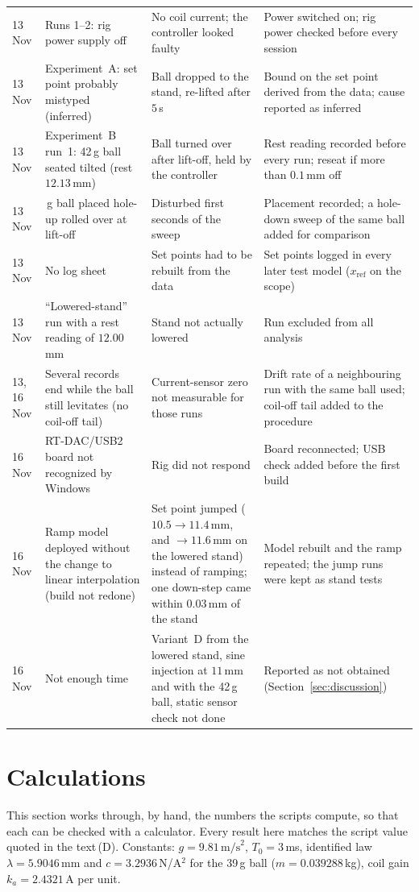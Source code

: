 \documentclass[11pt,a4paper]{article}
\newcommand{\st}[1]{\,\textup{(#1)}}
\begin{document}
{\begin{longtable}{@{}l>{\raggedright\arraybackslash}p{4.3cm}>{\raggedright\arraybackslash}p{4.2cm}>{\raggedright\arraybackslash}p{4.3cm}@{}}
13 Nov & Runs 1--2: rig power supply off & No coil current; the controller looked faulty & Power switched on; rig power checked before
every session \\
13 Nov & Experiment~A: set point probably mistyped (inferred) & Ball dropped to the stand, re-lifted after $5$\,s & Bound on the
set point derived from the data; cause reported as inferred \\
13 Nov & Experiment~B run~1: 42\,g ball seated tilted (rest $12.13$\,mm) & Ball turned over after lift-off, held by the
controller & Rest reading recorded before every run; reseat if more than $0.1$\,mm off \\
13 Nov & 42\,g ball placed hole-up rolled over at lift-off & Disturbed first seconds of the sweep & Placement recorded; a
hole-down sweep of the same ball added for comparison \\
13 Nov & No log sheet & Set points had to be rebuilt from the data & Set points logged in every later test model
($x_{\mathrm{ref}}$ on the scope) \\
13 Nov & ``Lowered-stand'' run with a rest reading of $12.00$\,mm & Stand not actually lowered & Run excluded from all
analysis \\
13, 16 Nov & Several records end while the ball still levitates (no coil-off tail) & Current-sensor zero not measurable for those
runs & Drift rate of a neighbouring run with the same ball used; coil-off tail added to the procedure \\
16 Nov & RT-DAC/USB2 board not recognized by Windows & Rig did not respond & Board reconnected; USB check added before the
first build \\
16 Nov & Ramp model deployed without the change to linear interpolation (build not redone) & Set point jumped
($10.5 \to 11.4$\,mm, and $\to 11.6$\,mm on the lowered stand) instead of ramping; one down-step came within $0.03$\,mm of the
stand & Model rebuilt and the ramp repeated; the jump runs were kept as stand tests \\

16 Nov & Not enough time & Variant~D from the lowered stand, sine injection at $11$\,mm and with the 42\,g ball, static sensor
check not done & Reported as not obtained (Section~\ref{sec:discussion}) \\
\bottomrule
\end{longtable}}

\section{Calculations}
\label{sec:calc}
This section works through, by hand, the numbers the scripts compute, so that each can be checked with a calculator.
Every result here matches the script value quoted in the text\st{D}. Constants: $g = 9.81\,\text{m/s}^2$, $T_0 = 3$\,ms,
identified law $\lambda = 5.9046$\,mm and $c = 3.2936$\,N/A$^2$ for the 39\,g ball ($m = 0.039288$\,kg), coil gain
$k_a = 2.4321$\,A per unit.
\end{document}
